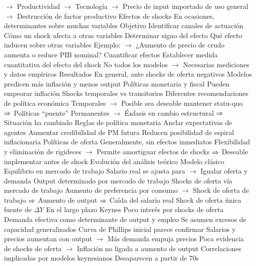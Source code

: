 \documentclass{nuevotema}
\begin{document}
\begin{esquemal}
				\4[] $\to$ Productividad
				\4[] $\to$ Tecnología
				\4[] $\to$ Precio de input importado de uso general
				\4[] $\to$ Destrucción de factor productivo
				\4 Efectos de shocks
				\4[] En ocasiones, determinantes sobre muchas variables
			\3 Objetivo
				\4 Identificar canales de actuación
				\4[] Cómo un shock afecta a otras variables
				\4 Determinar signo del efecto
				\4[] Qué efecto inducen sobre otras variables
				\4[] Ejemplo:
				\4[] $\to$ ¿Aumento de precio de crudo aumenta o reduce PIB nominal?
				\4 Cuantificar efectos
				\4[] Establecer medida cuantitativa del efecto del shock
				\4[] No todos los modelos
				\4[] $\to$ Necesarias mediciones y datos empíricos
			\3 Resultados
				\4 En general, ante shocks de oferta negativos
				\4[] Modelos predicen más inflación y menos output
				\4 Políticas monetaria y fiscal
				\4[] Pueden empeorar inflación
				\4 Shocks temporales vs transitorios
				\4[] Diferentes recomendaciones de política económica
				\4[] Temporales
				\4[] $\to$ Posible sea deseable mantener statu-quo
				\4[] $\Rightarrow$ Políticas ``puente''
				\4[] Permanentes
				\4[] $\to$ Énfasis en cambio estructural
				\4[] $\Rightarrow$ Situación ha cambiado
				\4 Reglas de política monetaria
				\4[] Anclar expectativas de agentes
				\4[] Aumentar credibilidad de PM futura
				\4[] Reducen posibilidad de espiral inflacionaria
				\4 Políticas de oferta
				\4[] Generalmente, sin efectos inmediatos
				\4[] Flexibilidad y eliminación de rigideces
				\4[] $\to$ Permite amortiguar efectos de shocks
				\4[] $\Rightarrow$ Deseable implementar antes de shock
		\2 Evolución del análisis teórico
			\3 Modelo clásico
				\4 Equilibrio en mercado de trabajo
				\4[] Salario real se ajusta para
				\4[] $\to$ Igualar oferta y demanda
				\4 Output determinado por mercado de trabajo
				\4 Shocks de oferta vía mercado de trabajo
				\4[] Aumento de preferencia por consumo
				\4[] $\to$ Shock de oferta de trabajo
				\4[] $\Rightarrow$ Aumento de output
				\4[] $\Rightarrow$ Caída del salario real
				\4 Shock de oferta única fuente de $\Delta Y$
				\4[] En el largo plazo
			\3 Keynes
				\4 Poco interés por shocks de oferta
				\4 Demanda efectiva como determinante de output y empleo
				\4 Se asumen excesos de capacidad generalizados
				\4 Curva de Phillips inicial parece confirmar
				\4[] Salarios y precios aumentan con output
				\4[] $\to$ Más demanda empuja precios
				\4[] Poca evidencia de shocks de oferta
				\4[] $\to$ Inflación no ligada a aumento de output
				\4 Correlaciones implicadas por modelos keynesianos
				\4[] Desaparecen a partir de 70s

\end{esquemal}
\end{document}
